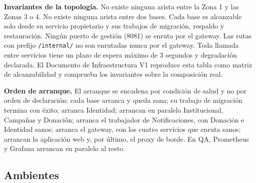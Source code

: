 \documentclass[11pt,a4paper]{article}
\begin{document}
\noindent\textbf{Invariantes de la topología.} No existe ninguna arista entre la Zona 1 y las Zonas 3 o 4. No existe ninguna arista entre dos bases. Cada base es alcanzable solo desde su servicio propietario y sus trabajos de migración, respaldo y restauración. Ningún puerto de gestión (8081) se enruta por el gateway. Las rutas con prefijo \texttt{/internal/} no son enrutadas nunca por el gateway. Toda llamada entre servicios tiene un plazo de espera máximo de 3 segundos y degradación declarada. El Documento de Infraestructura V1 reproduce esta tabla como matriz de alcanzabilidad y comprueba los invariantes sobre la composición real.

\vspace{0.2cm}
\noindent\textbf{Orden de arranque.} El arranque se encadena por condición de salud y no por orden de declaración: cada base arranca y queda sana; su trabajo de migración termina con éxito; arranca Identidad; arrancan en paralelo Institucional, Campañas y Donación; arranca el trabajador de Notificaciones, con Donación e Identidad sanos; arranca el gateway, con los cuatro servicios que enruta sanos; arrancan la aplicación web y, por último, el proxy de borde. En QA, Prometheus y Grafana arrancan en paralelo al resto.

\subsection{Ambientes}
\end{document}
